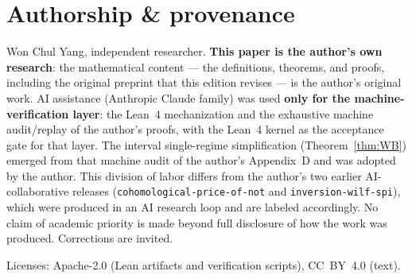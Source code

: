 \documentclass[11pt]{article}
\theoremstyle{remark}
\begin{document}
\section*{Authorship \& provenance}

Won Chul Yang, independent researcher. \textbf{This paper is the author's
own research}: the mathematical content --- the definitions, theorems, and
proofs, including the original preprint that this edition revises --- is
the author's original work. AI assistance (Anthropic Claude family) was
used \textbf{only for the machine-verification layer}: the Lean~4
mechanization and the exhaustive machine audit/replay of the author's
proofs, with the Lean~4 kernel as the acceptance gate for that layer. The
interval single-regime simplification (Theorem~\ref{thm:WB}) emerged from
that machine audit of the author's Appendix~D and was adopted by the
author. This division of labor differs from the author's two earlier
AI-collaborative releases (\texttt{cohomological-price-of-not} and
\texttt{inversion-wilf-spi}), which were produced in an AI research loop
and are labeled accordingly. No claim of academic priority is made beyond
full disclosure of how the work was produced. Corrections are invited.

Licenses: Apache-2.0 (Lean artifacts and verification scripts), CC~BY~4.0
(text).
\end{document}

